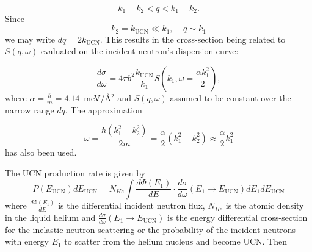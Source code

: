 \begin{equation}
k_1-k_2 < q < k_1+k_2.
\end{equation}
Since
\begin{equation}
k_2=k_{\text{UCN}} \ll k_1, \; \; \; \; q\sim k_1 
\end{equation}
we may write $dq=2k_{\text{UCN}}$. This results in the cross-section
being related to $S(q,\omega)$ evaluated on the incident neutron's
dispersion curve:

\begin{equation}
\frac{d\sigma}{d\omega}=4\pi b^2 \frac{k_{\text{UCN}}}{k_1}S \left(
k_1, \omega=\frac{\alpha k_1^2}{2} \right),
\end{equation}
where $\alpha=\frac{\hbar}{m}=4.14$~meV/\AA$^2$ and $S(q,\omega)$
assumed to be constant over the narrow range $dq$. The approximation

\begin{equation}
\omega=\frac{\hbar (k_1^2-k_2^2)}{2m}=\frac{\alpha}{2} (k_1^2 -
k_2^2)\approx \frac{\alpha}{2}k_1^2
\end{equation}
has also been used.

The UCN production rate is given by
\begin{equation}
\label{UCN_production}
P(E_{\text{UCN}}) dE_{\text{UCN}} = N_{He} \int \frac{d\Phi
  (E_1)}{dE}\cdot \frac{d \sigma}{d \omega}(E_1 \rightarrow
E_{\text{UCN}}) dE_1 dE_{\text{UCN}}
\end{equation}
where $\frac{d\Phi (E_1)}{dE}$ is the differential incident neutron
flux, $N_{He}$ is the atomic density in the liquid helium and $\frac{d
  \sigma}{d \omega}(E_1 \rightarrow E_{\text{UCN}})$ is the energy
differential cross-section for the inelastic neutron scattering or the
probability of the incident neutrons with energy $E_1$ to scatter from
the helium nucleus and become UCN.  Then

